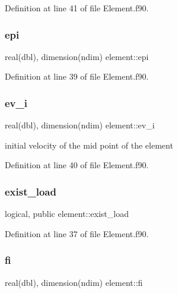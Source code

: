Definition at line 41 of file Element.\+f90.

\mbox{\label{namespaceelement_afd7049cf1988fff1d20ea9fae6290b27}} 
\subsubsection{\texorpdfstring{epi}{epi}}
{\footnotesize\ttfamily real(dbl), dimension(ndim) element\+::epi\hspace{0.3cm}{\ttfamily [private]}}



Definition at line 39 of file Element.\+f90.

\mbox{\label{namespaceelement_a38ecc4368e8e51d5672ad47f1a79536e}} 
\subsubsection{\texorpdfstring{ev\+\_\+i}{ev\_i}}
{\footnotesize\ttfamily real(dbl), dimension(ndim) element\+::ev\+\_\+i\hspace{0.3cm}{\ttfamily [private]}}



initial velocity of the mid point of the element 



Definition at line 40 of file Element.\+f90.

\mbox{\label{namespaceelement_a4fecf0570d257bca42bf4ece885f4721}} 
\subsubsection{\texorpdfstring{exist\+\_\+load}{exist\_load}}
{\footnotesize\ttfamily logical, public element\+::exist\+\_\+load}



Definition at line 37 of file Element.\+f90.

\mbox{\label{namespaceelement_aa97de262111f37b6e4b721cad221946a}} 
\subsubsection{\texorpdfstring{fi}{fi}}
{\footnotesize\ttfamily real(dbl), dimension(ndim) element\+::fi\hspace{0.3cm}{\ttfamily [private]}}



